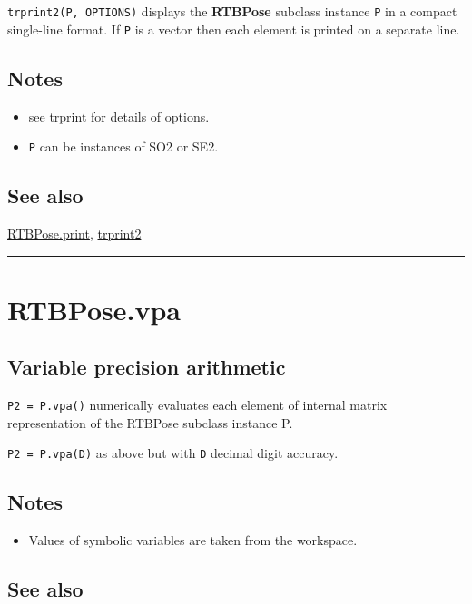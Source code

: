 \texttt{trprint2(P, OPTIONS)} displays the \textbf{\color{red} RTBPose} subclass instance \texttt{P} in a
compact single-line format.  If \texttt{P} is a vector then each element is
printed on a separate line.


\subsection*{Notes}
\begin{itemize}
  \item see trprint for details of options.
  \item \texttt{P} can be instances of SO2 or SE2.
\end{itemize}

\subsection*{See also}


\hyperlink{RTBPose.print}{\color{blue} RTBPose.print}, \hyperlink{trprint2}{\color{blue} trprint2}

\vspace{1.5ex}\hrule

\hypertarget{RTBPose.vpa}{\section*{RTBPose.vpa}}
\subsection*{Variable precision arithmetic}


\texttt{P2 = P.vpa()} numerically evaluates each element of
internal matrix representation of the RTBPose subclass instance P.



\texttt{P2 = P.vpa(D)} as above but with \texttt{D} decimal digit accuracy.


\subsection*{Notes}
\begin{itemize}
  \item Values of symbolic variables are taken from the workspace.
\end{itemize}

\subsection*{See also}


